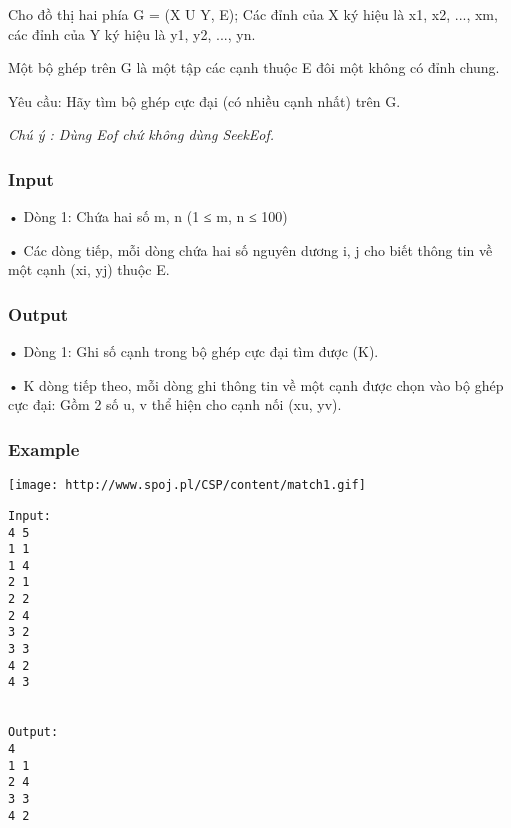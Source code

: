 



   Cho đồ thị hai phía G = (X U Y, E); Các đỉnh của X ký hiệu là x1, x2, ..., xm, các đỉnh của Y ký hiệu là y1, y2, ..., yn.   


   Một bộ ghép trên G là một tập các cạnh thuộc E đôi một không có đỉnh chung.   





       Yêu cầu: Hãy tìm bộ ghép cực đại (có nhiều cạnh nhất) trên G.      





\textit{    Chú ý : Dùng         Eof        chứ không dùng         SeekEof.       }

\subsubsection{   Input  }

   • Dòng 1: Chứa hai số m, n (1 ≤ m, n ≤ 100)   


   • Các dòng tiếp, mỗi dòng chứa hai số nguyên dương i, j cho biết thông tin về một cạnh (xi, yj) thuộc E.  

\subsubsection{   Output  }

   • Dòng 1: Ghi số cạnh trong bộ ghép cực đại tìm được (K).   


   • K dòng tiếp theo, mỗi dòng ghi thông tin về một cạnh được chọn vào bộ ghép cực đại: Gồm 2 số u, v thể hiện cho cạnh nối (xu, yv).  

\subsubsection{   Example  }
\texttt{[image: http://www.spoj.pl/CSP/content/match1.gif]}
\begin{verbatim}
Input:
4 5
1 1
1 4
2 1
2 2
2 4
3 2
3 3
4 2
4 3


Output:
4
1 1
2 4
3 3
4 2

\end{verbatim}
